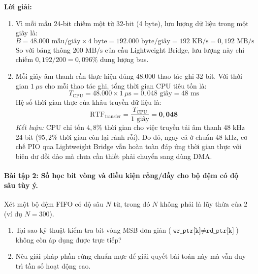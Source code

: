 \noindent\textbf{Lời giải:}
\begin{enumerate}[label=(\alph*), itemsep=2pt]
    \item Vì mỗi mẫu 24-bit chiếm một từ 32-bit (4 byte), lưu lượng dữ liệu trong một giây là:
    \begin{equation}
    B = 48.000\text{ mẫu/giây} \times 4\text{ byte} = 192.000\text{ byte/giây} = 192\text{ KB/s} = 0{,}192\text{ MB/s}
    \end{equation}
    So với băng thông $200\text{ MB/s}$ của cầu Lightweight Bridge, lưu lượng này chỉ chiếm $0{,}192 / 200 = 0{,}096\%$ dung lượng bus.
    \item Mỗi giây âm thanh cần thực hiện đúng $48.000$ thao tác ghi 32-bit. Với thời gian $1\ \mu\text{s}$ cho mỗi thao tác ghi, tổng thời gian CPU tiêu tốn là:
    \begin{equation}
    T_{\text{CPU}} = 48.000 \times 1\ \mu\text{s} = 0{,}048\text{ giây} = 48\text{ ms}
    \end{equation}
    Hệ số thời gian thực của khâu truyền dữ liệu là:
    \begin{equation}
    \text{RTF}_{\text{transfer}} = \frac{T_{\text{CPU}}}{1\text{ giây}} = \mathbf{0{,}048}
    \end{equation}
    \emph{Kết luận:} CPU chỉ tốn $4{,}8\%$ thời gian cho việc truyền tải âm thanh 48 kHz 24-bit ($95{,}2\%$ thời gian còn lại rảnh rỗi). Do đó, ngay cả ở chuẩn 48 kHz, cơ chế PIO qua Lightweight Bridge vẫn hoàn toàn đáp ứng thời gian thực với biên dư dồi dào mà chưa cần thiết phải chuyển sang dùng DMA.
\end{enumerate}

\paragraph{Bài tập 2: Số học bit vòng và điều kiện rỗng/đầy cho bộ đệm có độ sâu tùy ý.}
Xét một bộ đệm FIFO có độ sâu $N$ từ, trong đó $N$ không phải là lũy thừa của 2 (ví dụ $N = 300$).
\begin{enumerate}[label=(\alph*), itemsep=2pt]
    \item Tại sao kỹ thuật kiểm tra bit vòng MSB đơn giản ($\texttt{wr\_ptr[k]} \neq \texttt{rd\_ptr[k]}$) không còn áp dụng được trực tiếp?
    \item Nêu giải pháp phần cứng chuẩn mực để giải quyết bài toán này mà vẫn duy trì tần số hoạt động cao.
\end{enumerate}

